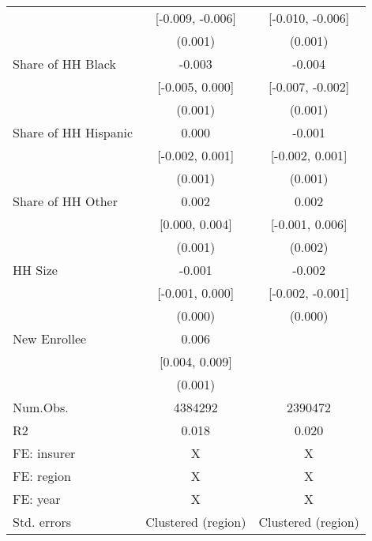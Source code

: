 \begin{table}[H]
\begin{table}[H]
\begin{tabular}[t]{lcc}
 & [-0.009, -0.006] & [-0.010, -0.006]\\
 & (0.001) & \vphantom{2} (0.001)\\
Share of HH Black & -0.003 & -0.004\\
 & [-0.005, 0.000] & [-0.007, -0.002]\\
 & (0.001) & \vphantom{1} (0.001)\\
Share of HH Hispanic & 0.000 & -0.001\\
 & [-0.002, 0.001] & [-0.002, 0.001]\\
 & (0.001) & (0.001)\\
Share of HH Other & 0.002 & 0.002\\
 & [0.000, 0.004] & [-0.001, 0.006]\\
 & (0.001) & (0.002)\\
HH Size & -0.001 & -0.002\\
 & [-0.001, 0.000] & [-0.002, -0.001]\\
 & (0.000) & (0.000)\\
New Enrollee & 0.006 & \\
 & [0.004, 0.009] & \\
 & (0.001) & \\
\midrule
Num.Obs. & 4384292 & 2390472\\
R2 & 0.018 & 0.020\\
FE: insurer & X & X\\
FE: region & X & X\\
FE: year & X & X\\
Std. errors & Clustered (region) & Clustered (region)\\
\bottomrule
\end{tabular}
\end{table}
\end{table}
